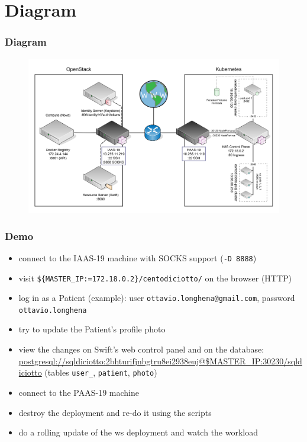 \documentclass[handout,10pt]{beamer}
\title[FCC-21 Group Project]{}
\author[Group 19]{}
\institute[Facchinetti, Franzil]{}
\date[09/06/2021]{9 June 2021}
\begin{document}
\section{Diagram}

\begin{frame}
    \frametitle{Diagram}
    \begin{figure}
    	\centering
    	\includegraphics[height=0.8\textheight]{diagram/diagram.png}
	\end{figure}
\end{frame}

\begin{frame}
    \frametitle{Demo}
    \begin{itemize}
		\item connect to the IAAS-19 machine with SOCKS support (\texttt{-D 8888})
		\item visit \texttt{\$\{MASTER\_IP:=172.18.0.2\}/centodiciotto/} on the browser (HTTP)
		\item log in as a Patient (example): user \texttt{ottavio.longhena@gmail.com}, password \texttt{ottavio.longhena}
		\item try to update the Patient's profile photo
		\item view the changes on Swift's web control panel and on the database: \url{postgresql://sqldiciotto:2bhturifjnbgtru8ei2938euj@$MASTER_IP:30230/sqldiciotto} (tables \texttt{user_}, \texttt{patient}, \texttt{photo})
		\item connect to the PAAS-19 machine
		\item destroy the deployment and re-do it using the scripts
		\item do a rolling update of the ws deployment and watch the workload
	\end{itemize}
\end{frame}
\end{document}
